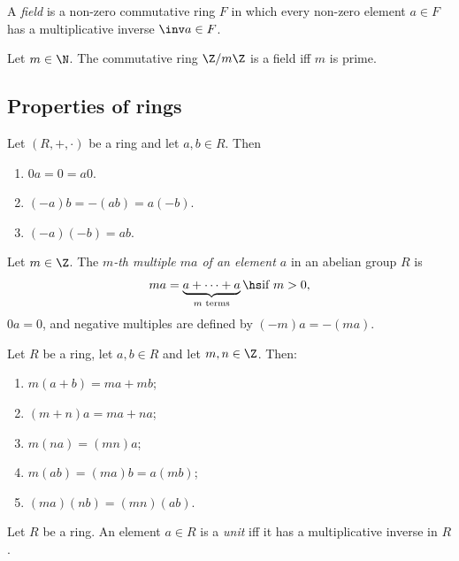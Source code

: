 \documentclass{article}
\begin{document}
\begin{definition}
	A \emph{field} is a non-zero commutative ring $F$ in which every non-zero element
	$a\in F$ has a multiplicative inverse $\inv a\in F$.
\end{definition}

\begin{proposition}[Proposition 3.1.11]
	Let $m\in\N$. The commutative ring $\Z/m\Z$ is a field iff $m$ is prime.
\end{proposition}

\subsection{Properties of rings}

\begin{lemma}[Lemma 3.2.1]
	Let $(R,+,\cdot)$ be a ring and let $a,b\in R$. Then
	\begin{enumerate}
		\item $0a=0=a0$.
		\item $(-a)b=-(ab)=a(-b)$.
		\item $(-a)(-b) = ab$.
	\end{enumerate}
\end{lemma}

\begin{definition}
	Let $m\in\Z$. The \emph{$m$-th multiple $ma$ of an element $a$} in an abelian
	group $R$ is
	\begin{align*}
		ma = \underbrace{a + \cdots + a}_\text{$m$ terms} \hs \text{if } m >0,
	\end{align*}
	$0a=0$, and negative multiples are defined by $(-m)a=-(ma)$.
\end{definition}

\begin{lemma}[Lemma 3.2.4]
	Let $R$ be a ring, let $a,b\in R$ and let $m,n\in\Z$. Then:
	\begin{enumerate}
		\item $m(a+b)=ma+mb$;
		\item $(m+n)a=ma+na$;
		\item $m(na)=(mn)a$;
		\item $m(ab)=(ma)b=a(mb)$;
		\item $(ma)(nb)=(mn)(ab)$.
	\end{enumerate}
\end{lemma}

\begin{definition}
	Let $R$ be a ring. An element $a\in R$ is a \emph{unit} iff it has a
	multiplicative inverse in $R$.
\end{definition}
\end{document}
